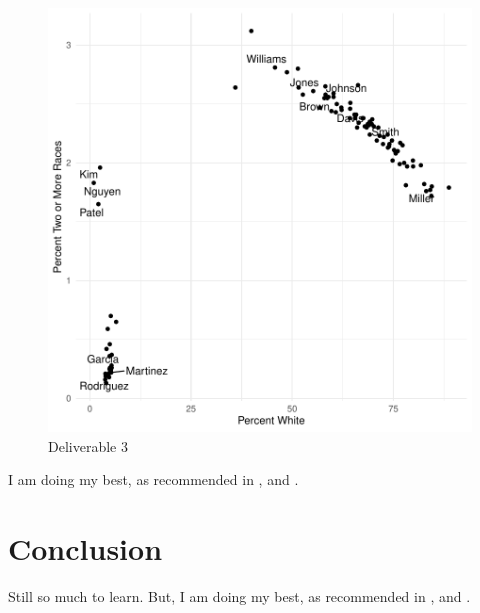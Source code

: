 \documentclass[a4paper, 12pt]{article}
\begin{document}
\begin{figure}[h]
\centering
\includegraphics{draft_paper_v4-theDeli_3}
\caption{Deliverable 3}  %
\label{fig:theDeli_3} %
\end{figure}

I am doing my best, as recommended in \citet{magallanes_reyes_data_2022}, and \citet{leisch_sweave_2024}.





\section{Conclusion}

Still so much to learn. But, I am doing my best, as recommended in \citet{magallanes_reyes_data_2022}, and \citet{leisch_sweave_2024}. 



\end{document}
